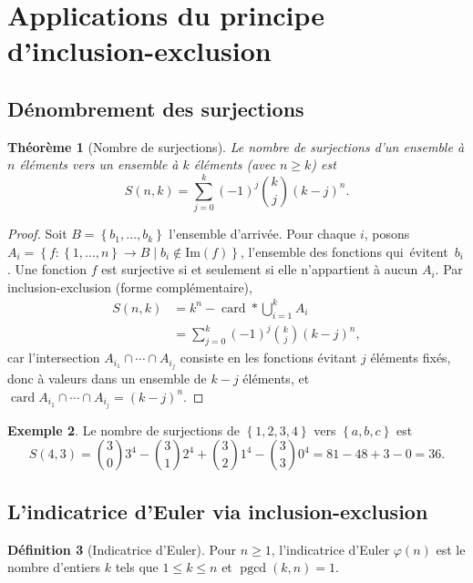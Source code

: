 \documentclass[12pt,a4paper,openany]{book}
\theoremstyle{definition}
\newtheorem{definition}{Définition}[chapter]
\newtheorem{exemple}[definition]{Exemple}
\theoremstyle{plain}
\newtheorem{theoreme}[definition]{Théorème}
\theoremstyle{remark}
\newcommand{\set}[1]{\left\{#1\right\}}
\DeclareMathOperator{\card}{card}
\DeclareMathOperator{\pgcd}{pgcd}
\providecommand{\og}{\guillemotleft\,}
\providecommand{\fg}{\,\guillemotright}
\begin{document}
\section{Applications du principe d'inclusion-exclusion}
\label{sec:ie-applications}

\subsection{Dénombrement des surjections}

\begin{theoreme}[Nombre de surjections]
\label{thm:surjections}
Le nombre de surjections d'un ensemble à $n$ éléments vers un ensemble à $k$
éléments (avec $n \geqslant k$) est
\[
  S(n,k) = \sum_{j=0}^{k} (-1)^{j} \binom{k}{j} (k-j)^n.
\]
\end{theoreme}

\begin{proof}
Soit $B = \set{b_1, \dots, b_k}$ l'ensemble d'arrivée. Pour chaque $i$,
posons $A_i = \set{f : \set{1,\dots,n} \to B \mid b_i \notin \text{Im}(f)}$,
l'ensemble des fonctions qui \og{}évitent\fg{} $b_i$.
Une fonction $f$ est surjective si et seulement si elle n'appartient à aucun $A_i$.
Par inclusion-exclusion (forme complémentaire),
\begin{align*}
  S(n,k) &= k^n - \card*{\bigcup_{i=1}^{k} A_i} \\
  &= \sum_{j=0}^{k} (-1)^{j} \binom{k}{j} (k-j)^n,
\end{align*}
car l'intersection $A_{i_1} \cap \cdots \cap A_{i_j}$ consiste en les fonctions
évitant $j$ éléments fixés, donc à valeurs dans un ensemble de $k-j$ éléments,
et $\card{A_{i_1} \cap \cdots \cap A_{i_j}} = (k-j)^n$.
\end{proof}

\begin{exemple}
\label{ex:surjections-calcul}
Le nombre de surjections de $\set{1,2,3,4}$ vers $\set{a,b,c}$ est
\[
  S(4,3) = \binom{3}{0} 3^4 - \binom{3}{1} 2^4 + \binom{3}{2} 1^4 - \binom{3}{3} 0^4
  = 81 - 48 + 3 - 0 = 36.
\]
\end{exemple}

\subsection{L'indicatrice d'Euler via inclusion-exclusion}

\begin{definition}[Indicatrice d'Euler]
\label{def:euler-totient}
Pour $n \geqslant 1$, l'indicatrice d'Euler $\varphi(n)$ est
le nombre d'entiers $k$ tels que $1 \leqslant k \leqslant n$ et $\pgcd(k,n) = 1$.
\end{definition}
\end{document}
